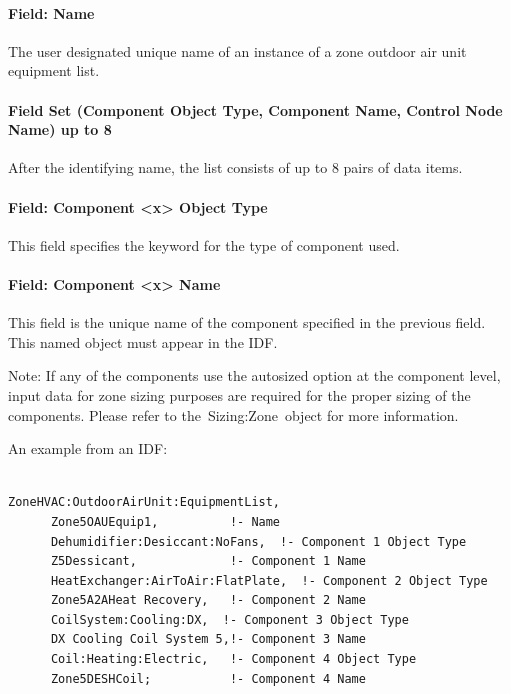 \paragraph{Field: Name}\label{field-name-6-027}

The user designated unique name of an instance of a zone outdoor air unit equipment list.

\paragraph{Field Set (Component Object Type, Component Name, Control Node Name) up to 8}\label{field-set-component-object-type-component-name-control-node-name-up-to-8}

After the identifying name, the list consists of up to 8 pairs of data items.

\paragraph{Field: Component \textless{}x\textgreater{} Object Type}\label{field-component-x-object-type-000}

This field specifies the keyword for the type of component used.

\paragraph{Field: Component \textless{}x\textgreater{} Name}\label{field-component-x-name-000}

This field is the unique name of the component specified in the previous field. This named object must appear in the IDF.

Note: If any of the components use the autosized option at the component level, input data for zone sizing purposes are required for the proper sizing of the components. Please refer to the~Sizing:Zone~object for more information.

An example from an IDF:

\begin{lstlisting}

ZoneHVAC:OutdoorAirUnit:EquipmentList,
      Zone5OAUEquip1,          !- Name
      Dehumidifier:Desiccant:NoFans,  !- Component 1 Object Type
      Z5Dessicant,             !- Component 1 Name
      HeatExchanger:AirToAir:FlatPlate,  !- Component 2 Object Type
      Zone5A2AHeat Recovery,   !- Component 2 Name
      CoilSystem:Cooling:DX,  !- Component 3 Object Type
      DX Cooling Coil System 5,!- Component 3 Name
      Coil:Heating:Electric,   !- Component 4 Object Type
      Zone5DESHCoil;           !- Component 4 Name
\end{lstlisting}

